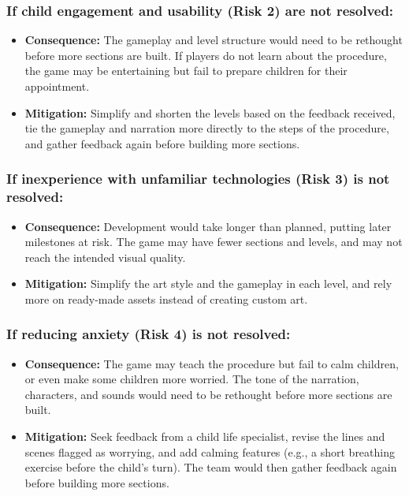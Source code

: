 \documentclass{article}
\begin{document}
\subsubsection*{If child engagement and usability (Risk 2) are not resolved:}
\begin{itemize}
  \item \textbf{Consequence:} The gameplay and level structure would need to be
  rethought before more sections are built. If players do not learn about the
  procedure, the game may be entertaining but fail to prepare children for
  their appointment.
  \item \textbf{Mitigation:} Simplify and shorten the levels based on the
  feedback received, tie the gameplay and narration more directly to the steps
  of the procedure, and gather feedback again before building more sections.
\end{itemize}

\subsubsection*{If inexperience with unfamiliar technologies (Risk 3) is not resolved:}
\begin{itemize}
  \item \textbf{Consequence:} Development would take longer than planned, putting
  later milestones at risk. The game may have fewer sections and levels, and may
  not reach the intended visual quality.
  \item \textbf{Mitigation:} Simplify the art style and the gameplay in each
  level, and rely more on ready-made assets instead of creating custom art.
\end{itemize}

\subsubsection*{If reducing anxiety (Risk 4) is not resolved:}
\begin{itemize}
  \item \textbf{Consequence:} The game may teach the procedure but fail to calm
  children, or even make some children more worried. The tone of the narration,
  characters, and sounds would need to be rethought before more sections are
  built.
  \item \textbf{Mitigation:} Seek feedback from a child life specialist, revise
  the lines and scenes flagged as worrying, and add calming features (e.g., a
  short breathing exercise before the child's turn). The team would then gather
  feedback again before building more sections.
\end{itemize}
\end{document}
